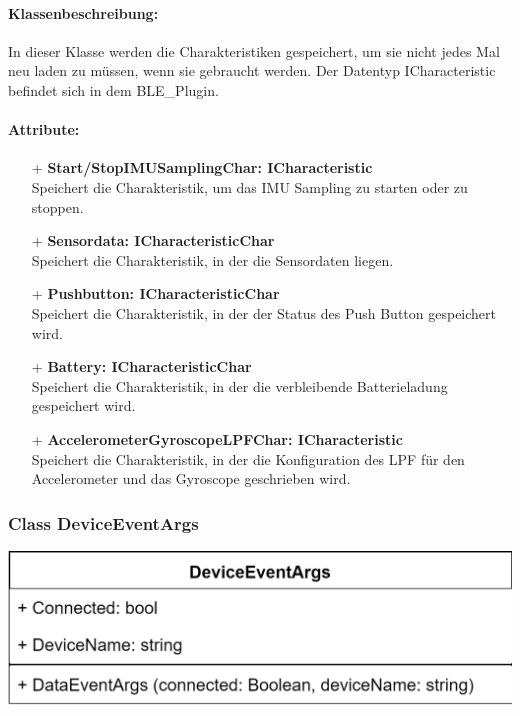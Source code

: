 \documentclass[a4paper,12pt]{article}
\begin{document}
\paragraph{Klassenbeschreibung:}
In dieser Klasse werden die Charakteristiken gespeichert, um sie nicht jedes Mal neu laden zu müssen, wenn sie gebraucht werden. Der Datentyp ICharacteristic befindet sich in dem BLE\_Plugin.

\paragraph{Attribute:}
\begin{itemize}
	\item[+] \textbf{Start/StopIMUSamplingChar: ICharacteristic}\\Speichert die Charakteristik, um das IMU Sampling zu starten oder zu stoppen.
	\item[+] \textbf{Sensordata: ICharacteristicChar}\\Speichert die Charakteristik, in der die Sensordaten liegen.
	\item[+] \textbf{Pushbutton: ICharacteristicChar}\\Speichert die Charakteristik, in der der Status des Push Button gespeichert wird.
	\item[+] \textbf{Battery: ICharacteristicChar}\\Speichert die Charakteristik, in der die verbleibende Batterieladung gespeichert wird.
	\item[+] \textbf{AccelerometerGyroscopeLPFChar: ICharacteristic}\\Speichert die Charakteristik, in der die Konfiguration des LPF für den Accelerometer und das Gyroscope geschrieben wird.
\end{itemize}

\begin{minipage}[b]{0.5\textwidth}
	\subsubsection{Class DeviceEventArgs}
	
	\end{minipage}
	\begin{minipage}[c]{0.5\textwidth}
	\includegraphics[width=\textwidth]{bilder/BibPackageKlassen/DeviceEventArgs.png}
\end{minipage}
\end{document}
